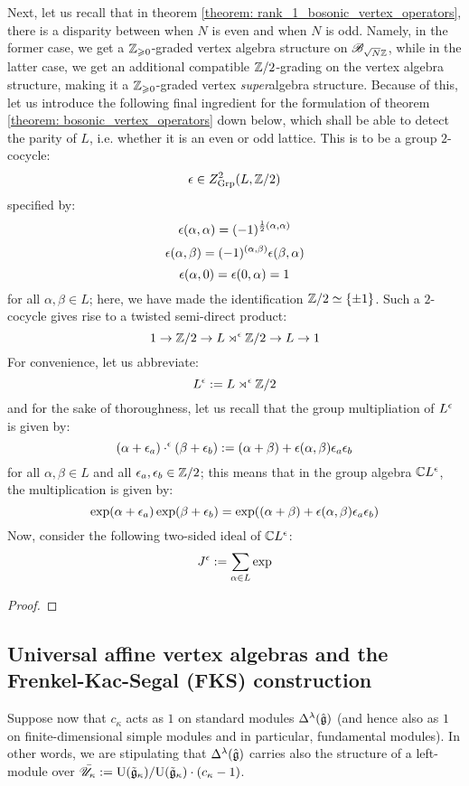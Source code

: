         Next, let us recall that in theorem \ref{theorem: rank_1_bosonic_vertex_operators}, there is a disparity between when $N$ is even and when $N$ is odd. Namely, in the former case, we get a $\mathbb{Z}_{\geqslant 0}$-graded vertex algebra structure on $\mathscr{B}_{\sqrt{N} \mathbb{Z}}$, while in the latter case, we get an additional compatible $\mathbb{Z}/2$-grading on the vertex algebra structure, making it a $\mathbb{Z}_{\geqslant 0}$-graded vertex \textit{super}algebra structure. Because of this, let us introduce the following final ingredient for the formulation of theorem \ref{theorem: bosonic_vertex_operators} down below, which shall be able to detect the parity of $L$, i.e. whether it is an even or odd lattice. This is to be a group $2$-cocycle:
            $$\epsilon \in Z^2_{\mathrm{Grp}}( L, \mathbb{Z}/2 )$$
        specified by:
            $$\epsilon(\alpha, \alpha) = (-1)^{\frac12 (\alpha, \alpha)}$$
            $$\epsilon(\alpha, \beta) = (-1)^{(\alpha, \beta)} \epsilon(\beta, \alpha)$$
            $$\epsilon(\alpha, 0) = \epsilon(0, \alpha) = 1$$
        for all $\alpha, \beta \in L$; here, we have made the identification $\mathbb{Z}/2 \simeq \{\pm 1\}$. Such a $2$-cocycle gives rise to a twisted semi-direct product:
            $$1 \to \mathbb{Z}/2 \to L \rtimes^{\epsilon} \mathbb{Z}/2 \to L \to 1$$
        For convenience, let us abbreviate:
            $$L^{\epsilon} := L \rtimes^{\epsilon} \mathbb{Z}/2$$
        and for the sake of thoroughness, let us recall that the group multipliation of $L^{\epsilon}$ is given by:
            $$(\alpha + \epsilon_a) \cdot^{\epsilon} (\beta + \epsilon_b) := (\alpha + \beta) + \epsilon(\alpha, \beta) \epsilon_a \epsilon_b$$
        for all $\alpha, \beta \in L$ and all $\epsilon_a, \epsilon_b \in \mathbb{Z}/2$; this means that in the group algebra $\mathbb{C} L^{\epsilon}$, the multiplication is given by:
            $$\exp(\alpha + \epsilon_a) \exp(\beta + \epsilon_b) = \exp( (\alpha + \beta) + \epsilon(\alpha, \beta) \epsilon_a \epsilon_b )$$
        Now, consider the following two-sided ideal of $\mathbb{C} L^{\epsilon}$:
            $$J^{\epsilon} := \sum_{\alpha \in L} \exp$$

        \begin{theorem} \label{theorem: bosonic_vertex_operators}
            
        \end{theorem}
            \begin{proof}
                
            \end{proof}

    \subsection{Universal affine vertex algebras and the Frenkel-Kac-Segal (FKS) construction}
        \begin{convention}
            Suppose now that $c_{\kappa}$ acts as $1$ on standard modules $\Delta^{\lambda}(\hat{\mathfrak{g}})$ (and hence also as $1$ on finite-dimensional simple modules and in particular, fundamental modules). In other words, we are stipulating that $\Delta^{\lambda}(\hat{\mathfrak{g}})$ carries also the structure of a left-module over $\bar{\mathscr{U}}_{\kappa} := \mathrm{U}(\tilde{\mathfrak{g}}_{\kappa})/\mathrm{U}(\tilde{\mathfrak{g}}_{\kappa}) \cdot (c_{\kappa} - 1)$.
        \end{convention}

